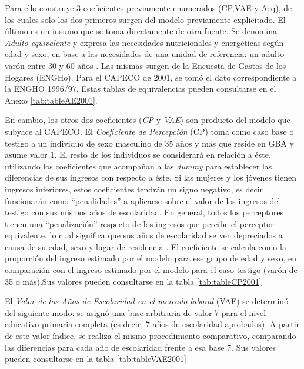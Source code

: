 Para ello construye 3 coeficientes previamente enumerados (CP,VAE y Aeq), de los cuales solo los dos primeros surgen del modelo previamente explicitado. El último es un insumo que se toma directamente de otra fuente. Se denomina \textit{Adulto equivalente} y expresa las necesidades nutricionales y energéticas según edad y sexo, en base a las necesidades de una unidad de referencia: un adulto varón entre 30 y 60 años \cite{indec2016b}. Las mismas surgen de la Encuesta de Gastos de los Hogares (ENGHo). Para el CAPECO de 2001, se tomó el dato correspondiente a la ENGHO 1996/97. Estas tablas de equivalencias pueden consultarse en el Anexo \ref{tab:tableAE2001}.

En cambio, los otros dos coeficientes (\textit{CP} y \textit{VAE}) son producto del modelo que subyace al CAPECO. El \textit{Coeficiente de Percepción} (CP) toma como caso base o testigo a un individuo de sexo masculino de 35 años y más que reside en GBA y asume valor 1. El resto de los individuos se considerará en relación a éste, utilizando los coeficientes que acompañan a las \textit{dummy} para establecer las diferencias de sus ingresos con respecto a éste. Si las mujeres y los jóvenes tienen ingresos inferiores, estos coeficientes tendrán un signo negativo, es decir funcionarán como “penalidades” a aplicarse sobre el valor de los ingresos del testigo
con sus mismos años de escolaridad. En general, todos los perceptores tienen una “penalización” respecto de los ingresos que percibe el perceptor equivalente, lo cual significa que sus años de escolaridad se ven depreciados a causa de su edad, sexo y lugar de residencia \cite{indec2016b}. El coeficiente se calcula como la proporción del ingreso estimado por el modelo para ese grupo de edad y sexo, en comparación con el ingreso estimado por el modelo para el caso testigo (varón de 35 o más).Sus valores pueden consultarse en la tabla \ref{tab:tableCP2001}


El \textit{Valor de los Años de Escolaridad en el mercado laboral} (VAE) se determinó del siguiente modo: se asignó una base arbitraria de valor 7 para el nivel educativo primaria completa (es decir, 7 años de escolaridad aprobados). A partir de este valor índice, se realiza el mismo procedimiento comparativo, comparando las diferencias para cada año de escolaridad frente a esa base 7. Sus valores pueden consultarse en la tabla \ref{tab:tableVAE2001}
 


